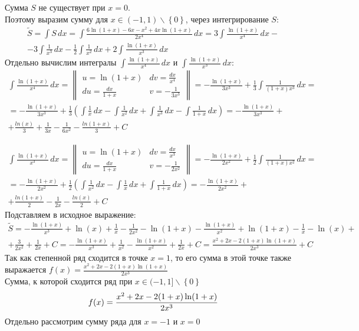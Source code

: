 \documentclass[a5paper, 10pt]{article}
\theoremstyle{definition}
\theoremstyle{plain}
\theoremstyle{remark}
\begin{document}
Сумма $S$  не существует при $x = 0$.\\
Поэтому выразим сумму для $ x \in (-1, 1) \backslash \left\{0 \right\}$, через интегрирование $S$:
\begin{multline*}
\widetilde{S } = \int S \, dx = \int  \frac{6\ln (1+x) - 6x - x^2 + 4x \ln (1+x)}{2x^4} \, dx = 3  \int  \frac{\ln (1+x)}{x^4}  \, dx -\\
- 3\int  \frac{1}{x^3} \, dx - \frac{1}{2}\int  \frac{1}{x^2} \, dx + 2 \int  \frac{\ln (1+x)}{x^3} \, dx
\end{multline*}
Отдельно вычислим интегралы $\int  \frac{\ln (1+x)}{x^4}  \, dx$ и $\int  \frac{\ln (1+x)}{x^3} \, dx$:
\begin{multline*}
\int  \frac{\ln (1+x)}{x^4}  \, dx = 
\begin{Vmatrix}
u = \ln (1+x) & dv = \frac{dx}{x^4} \\
du = \frac{dx}{1+x} & v = -\frac{1}{3x^3}
\end{Vmatrix}
= -\frac{\ln (1+x)}{3x^3} + \frac{1}{3}\int  \frac{1}{(1+x)x^3}  \, dx =\\
= -\frac{\ln (1+x)}{3x^3} +\frac{1}{3} \left( \int  \frac{1}{x} \, dx - \int  \frac{1}{x^2} \, dx+ \int  \frac{1}{x^3} \, dx -\int  \frac{1}{1+x} \, dx\right) = -\frac{\ln (1+x)}{3x^3} +\\
+\frac{ln(x)}{3} + \frac{1}{3x} - \frac{1}{6x^2} - \frac{ln(1+x)}{3}+C
\end{multline*}

\begin{multline*}
\int  \frac{\ln (1+x)}{x^3}  \, dx = 
\begin{Vmatrix}
u = \ln (1+x) & dv = \frac{dx}{x^3} \\
du = \frac{dx}{1+x} & v = -\frac{1}{2x^2}
\end{Vmatrix}
= -\frac{\ln (1+x)}{2x^2} + \frac{1}{2}\int  \frac{1}{(1+x)x^2}  \, dx =\\
= -\frac{\ln (1+x)}{2x^2} +\frac{1}{2} \left(\int  \frac{1}{x^2} \, dx - \int  \frac{1}{x} \, dx  +\int  \frac{1}{1+x} \, dx\right) = -\frac{\ln (1+x)}{2x^2} +\\
+\frac{ln(1+x)}{2} - \frac{1}{2x} - \frac{ln(x)}{2}+C
\end{multline*}
Подставляем в исходное выражение:
\begin{multline*}
\widetilde{S} =  -\frac{\ln (1+x)}{x^3} +\ln(x) + \frac{1}{x} - \frac{1}{2x^2} - \ln(1+x)
-\frac{\ln (1+x)}{x^2} +\ln(1+x) - \frac{1}{x} - \ln(x) +\\
+ \frac{3}{2x^2} + \frac{1}{2x} + C=  -\frac{\ln (1+x)}{x^3} + \frac{1}{x^2} -\frac{\ln (1+x)}{x^2}+ \frac{1}{2x} +C=
\frac{ x^2 + 2x -2(1+x) \ln(1+x)}{2x^3}+C
\end{multline*}
Так как степенной ряд сходится в точке $x=1$, то его сумма в этой точке также выражается $ f(x) =\frac{ x^2 + 2x -2(1+x) \ln(1+x)}{2x^3}$\\
 Сумма, к которой сходится ряд при $ x \in (-1, 1] \backslash \left\{0 \right\}$
\begin{equation*}
 f(x) =\frac{ x^2 + 2x -2(1+x) \ln(1+x)}{2x^3}\\
\end{equation*}
Отдельно рассмотрим сумму ряда для  $x = -1$ и $x = 0$
\end{document}

